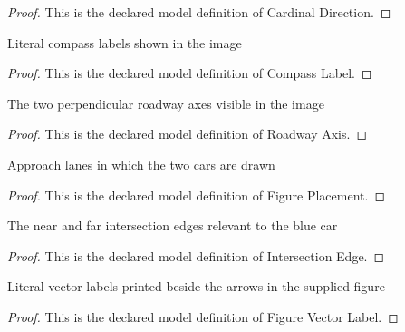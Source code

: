 \begin{proof}
  This is the declared model definition of Cardinal Direction.
\end{proof}
\begin{definition}
  \label{def:physics:phyx-mini-0674:phyxminiproblems-problemphyxmini0674-compasslabel}
  Literal compass labels shown in the image
\end{definition}
\begin{proof}
  This is the declared model definition of Compass Label.
\end{proof}
\begin{definition}
  \label{def:physics:phyx-mini-0674:phyxminiproblems-problemphyxmini0674-roadwayaxis}
  The two perpendicular roadway axes visible in the image
\end{definition}
\begin{proof}
  This is the declared model definition of Roadway Axis.
\end{proof}
\begin{definition}
  \label{def:physics:phyx-mini-0674:phyxminiproblems-problemphyxmini0674-figureplacement}
  Approach lanes in which the two cars are drawn
\end{definition}
\begin{proof}
  This is the declared model definition of Figure Placement.
\end{proof}
\begin{definition}
  \label{def:physics:phyx-mini-0674:phyxminiproblems-problemphyxmini0674-intersectionedge}
  The near and far intersection edges relevant to the blue car
\end{definition}
\begin{proof}
  This is the declared model definition of Intersection Edge.
\end{proof}
\begin{definition}
  \label{def:physics:phyx-mini-0674:phyxminiproblems-problemphyxmini0674-figurevectorlabel}
  Literal vector labels printed beside the arrows in the supplied figure
\end{definition}
\begin{proof}
  This is the declared model definition of Figure Vector Label.
\end{proof}
